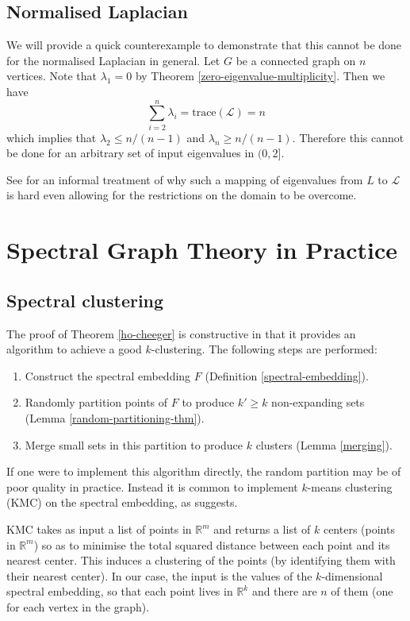 \documentclass[a4paper,11pt]{article}
\theoremstyle{definition}
\newcommand{\R}{\mathbb{R}}
\renewcommand{\L}{\mathcal{L}}
\begin{document}
\subsection{Normalised Laplacian}

We will provide a quick counterexample to demonstrate that this cannot be done for the normalised Laplacian in general. Let $G$ be a connected graph on $n$ vertices. Note that $\lambda_1 = 0$ by Theorem \ref{zero-eigenvalue-multiplicity}. Then we have
\[
\sum_{i=2}^n \lambda_i = \text{trace}(\L) = n
\]
which implies that $\lambda_2 \le n/(n-1)$ and $\lambda_n \ge n/(n-1)$. Therefore this cannot be done for an arbitrary set of input eigenvalues in $(0, 2]$.

See \cite[Appendix A]{eigenvector-mapping} for an informal treatment of why such a mapping of eigenvalues from $L$ to $\L$ is hard even allowing for the restrictions on the domain to be overcome.

\section{Spectral Graph Theory in Practice}\label{applications}

\subsection{Spectral clustering}

The proof of Theorem \ref{ho-cheeger} is constructive in that it provides an algorithm to achieve a good $k$-clustering. The following steps are performed:
\begin{enumerate}
\item Construct the spectral embedding $F$ (Definition \ref{spectral-embedding}).
\item Randomly partition points of $F$ to produce $k' \ge k$ non-expanding sets (Lemma \ref{random-partitioning-thm}).
\item Merge small sets in this partition to produce $k$ clusters (Lemma \ref{merging}).
\end{enumerate}

If one were to implement this algorithm directly, the random partition may be of poor quality in practice. Instead it is common to implement $k$-means clustering (KMC) on the spectral embedding, as \cite{main} suggests.

\medskip

KMC takes as input a list of points in $\R^m$ and returns a list of $k$ centers (points in $\R^m$) so as to minimise the total squared distance between each point and its nearest center. This induces a clustering of the points (by identifying them with their nearest center). In our case, the input is the values of the $k$-dimensional spectral embedding, so that each point lives in $\R^k$ and there are $n$ of them (one for each vertex in the graph).
\end{document}
